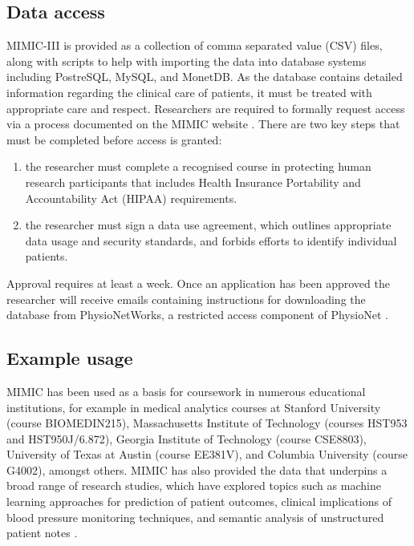 \documentclass[english]{article}
\begin{document}

\subsection*{Data access}

MIMIC-III is provided as a collection of comma separated value (CSV) files, along with scripts to help with importing the data into database systems including PostreSQL, MySQL, and MonetDB. As the database contains detailed information regarding the clinical care of patients, it must be treated with appropriate care and respect. Researchers are required to formally request access via a process documented on the MIMIC website \cite{cite-mimic-website}. There are two key steps that must be completed before access is granted:

\begin{enumerate}
  \item the researcher must complete a recognised course in protecting human research participants that includes Health Insurance Portability and Accountability Act (HIPAA) requirements.
  \item the researcher must sign a data use agreement, which outlines appropriate data usage and security standards, and forbids efforts to identify individual patients.
\end{enumerate}

Approval requires at least a week. Once an application has been approved the researcher will receive emails containing instructions for downloading the database from PhysioNetWorks, a restricted access component of PhysioNet \cite{cite6}.

\subsection*{Example usage}

MIMIC has been used as a basis for coursework in numerous educational institutions, for example in medical analytics courses at Stanford University (course BIOMEDIN215), Massachusetts Institute of Technology (courses HST953 and HST950J/6.872), Georgia Institute of Technology (course CSE8803), University of Texas at Austin (course EE381V), and Columbia University (course G4002), amongst others. MIMIC has also provided the data that underpins a broad range of research studies, which have explored topics such as machine learning approaches for prediction of patient outcomes, clinical implications of blood pressure monitoring techniques, and semantic analysis of unstructured patient notes \cite{mimic-mayaud, mimic-lehman, mimic-velupillai, mimic-abhyankar}.
\end{document}
